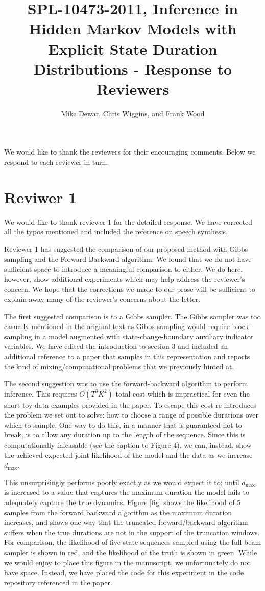 \documentclass{article}
\title{SPL-10473-2011, Inference in Hidden Markov Models with Explicit State Duration Distributions - Response to Reviewers}
\author{Mike Dewar, Chris Wiggins, and Frank Wood}
\begin{document}
\maketitle
We would like to thank the reviewers for their encouraging comments. Below we respond to each reviewer in turn.

\section*{Reviwer 1}

We would like to thank reviewer 1 for the detailed response. We have corrected all the typos mentioned and included the reference on speech synthesis. 

Reviewer 1 has suggested the comparison of our proposed method with Gibbs sampling and the Forward Backward algorithm. We found that we do not have sufficient space to introduce a meaningful comparison to either.  We do here, however, show additional experiments which may help address the reviewer's concern.  We hope that the corrections we made to our prose will be sufficient to explain away many of the reviewer's concerns about the letter.

The first suggested comparison is to a Gibbs sampler.  The Gibbs sampler was too casually mentioned in the original text as Gibbs sampling would require block-sampling in a model augmented with state-change-boundary auxiliary indicator variables.   We have edited the introduction to section 3 and included an additional reference to a paper that samples in this representation and reports the kind of mixing/computational problems that we previously hinted at.

The second suggestion was to use the forward-backward algorithm to perform inference. This requires $O(T^3K^2)$ total cost which is impractical for even the short toy data examples provided in the paper. To escape this cost re-introduces the problem we set out to solve: how to choose a range of possible durations over which to sample. One way to do this, in a manner that is guaranteed not to break, is to allow any duration up to the length of the sequence. Since this is computationally infeasable (see the caption to Figure 4), we can, instead, show the achieved expected joint-likelihood of the model and the data as we increase $d_\mathrm{max}$.  

This unsurprisingly performs poorly exactly as we would expect it to: until $d_\mathrm{max}$ is increased to a value that captures the maximum duration the model fails to adequately capture the true dynamics. Figure \ref{fig} shows the likelihood of 5 samples from the forward backward algorithm as the maximum duration increases, and shows one way that the truncated forward/backward algorithm suffers when the true durations are not in the support of the truncation windows. For comparison, the likelihood of five state sequences sampled using the full beam sampler is shown in red, and the likelihood of the truth is shown in green. While we would enjoy to place this figure in the manuscript, we unfortunately do not have space. Instead, we have placed the code for this experiment in the code repository referenced in the paper. 
\end{document}
